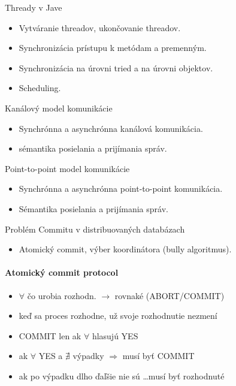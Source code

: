 \documentclass[a4paper]{report}
\begin{document}
\begin{zadanie}{Thready v Jave}
\begin{itemize}
 \item Vytváranie threadov, ukončovanie threadov.
 \item Synchronizácia prístupu k metódam a premenným.
 \item Synchronizácia na úrovni tried a na úrovni objektov.
 \item Scheduling.
\end{itemize}
\end{zadanie}

\begin{zadanie}{Kanálový model komunikácie}
\begin{itemize}
 \item Synchrónna a asynchrónna kanálová komunikácia.
 \item sémantika posielania a prijímania správ.
\end{itemize}
\end{zadanie}

\begin{zadanie}{Point-to-point model komunikácie}
\begin{itemize}
 \item Synchrónna a asynchrónna point-to-point komunikácia.
 \item Sémantika posielania a prijímania správ.
\end{itemize}
\end{zadanie}

\begin{zadanie}{Problém Commitu v distribuovaných databázach}
\begin{itemize}
 \item Atomický commit, výber koordinátora (bully algoritmus).
\end{itemize}
\end{zadanie}

\paragraph{Atomický commit protocol}

\begin{itemize}
 \item $\forall$ čo urobia rozhodn. $\rightarrow$ rovnaké (ABORT/COMMIT)
 \item keď sa proces rozhodne, už svoje rozhodnutie nezmení
 \item COMMIT len ak $\forall$ hlasujú YES
 \item ak $\forall$ YES a $\nexists$ výpadky $\Rightarrow$ musí byť COMMIT
 \item ak po výpadku dlho ďaľšie nie sú \ldots musí byť rozhodnuté
\end{itemize}
\end{document}
